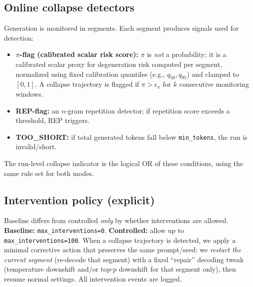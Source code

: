 \documentclass{article}
\begin{document}
\subsection{Online collapse detectors}
Generation is monitored in segments. Each segment produces signals used for detection:
\begin{itemize}[leftmargin=*]
  \item \textbf{$\pi$-flag (calibrated scalar risk score):}
  $\pi$ is \emph{not} a probability; it is a calibrated scalar proxy for degeneration risk computed per segment,
  normalized using fixed calibration quantiles (e.g., $q_{50}, q_{95}$) and clamped to $[0,1]$.
  A collapse trajectory is flagged if $\pi > \epsilon_{\pi}$ for $k$ consecutive monitoring windows.
  \item \textbf{REP-flag:} an $n$-gram repetition detector; if repetition score exceeds a threshold, REP triggers.
  \item \textbf{TOO\_SHORT:} if total generated tokens fall below \texttt{min\_tokens}, the run is invalid/short.
\end{itemize}
The run-level collapse indicator is the logical OR of these conditions, using the same rule set for both modes.

\subsection{Intervention policy (explicit)}
Baseline differs from controlled \emph{only} by whether interventions are allowed.
\textbf{Baseline:} \texttt{max\_interventions=0}. \;
\textbf{Controlled:} allow up to \texttt{max\_interventions=100}.
When a collapse trajectory is detected, we apply a minimal corrective action that preserves the same prompt/seed:
we \emph{restart the current segment} (re-decode that segment) with a fixed ``repair'' decoding tweak
(temperature downshift and/or top-$p$ downshift for that segment only), then resume normal settings.
All intervention events are logged.
\end{document}
